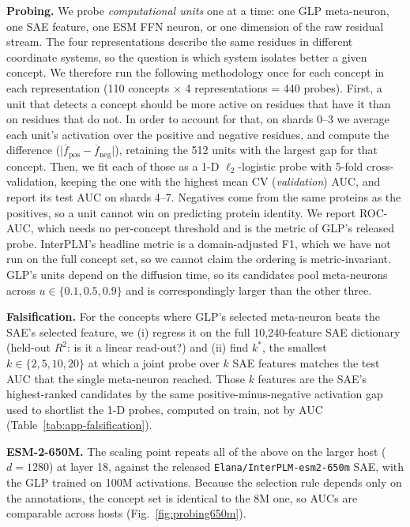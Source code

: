 \documentclass{article}
\begin{document}
\newpage
\textbf{Probing.} We probe \emph{computational units} one at a time: one GLP
meta-neuron, one SAE feature, one ESM FFN neuron, or one dimension of the raw residual stream.
The four representations describe the same residues in different coordinate systems, so the
question is which system isolates better a given concept. We therefore run the
following methodology once for each concept in each representation (110 concepts $\times$ 4
representations = 440 probes). First, a unit that detects a concept should be more active on residues that have it than
on residues that do not. In order to account for that, on shards 0--3 we average each unit's activation over the
positive and negative residues, and compute the difference
($\lvert\overline{f}_{\text{pos}}-\overline{f}_{\text{neg}}\rvert$), retaining the 512 units with the largest gap for that concept. Then, we fit each of those as a 1-D $\ell_2$-logistic probe with 5-fold
cross-validation, keeping the one with the highest mean CV (\emph{validation}) AUC, and report its
test AUC on shards 4--7. Negatives come from the same proteins as the positives, so a unit
cannot win on predicting protein identity. We report ROC-AUC, which needs no per-concept threshold and is the metric of GLP's released
probe. InterPLM's headline metric is a domain-adjusted F1, which we have not run on the full
concept set, so we cannot claim the ordering is metric-invariant. GLP's units depend on the diffusion time, so its candidates pool meta-neurons across
$u\in\{0.1,0.5,0.9\}$ and is correspondingly larger than the other three. 


\textbf{Falsification.} For the concepts where GLP's selected meta-neuron beats the SAE's
selected feature, we (i) regress it on the full 10{,}240-feature SAE dictionary (held-out
$R^2$: is it a linear read-out?) and (ii) find $k^{*}$, the smallest $k\in\{2,5,10,20\}$ at which a joint probe over $k$ SAE
features matches the test AUC that the single meta-neuron reached. Those $k$ features are the
SAE's highest-ranked candidates by the same positive-minus-negative activation gap used to
shortlist the 1-D probes, computed on train, not by AUC (Table~\ref{tab:app-falsification}).


\textbf{ESM-2-650M.} The scaling point repeats all of the above on the larger host ($d{=}1280$)
at layer 18, against the released \texttt{Elana/InterPLM-esm2-650m} SAE, with the GLP trained on
100M activations. Because the selection rule depends only on the annotations, the concept set is
identical to the 8M one, so AUCs are comparable across hosts (Fig.~\ref{fig:probing650m}).
\end{document}
